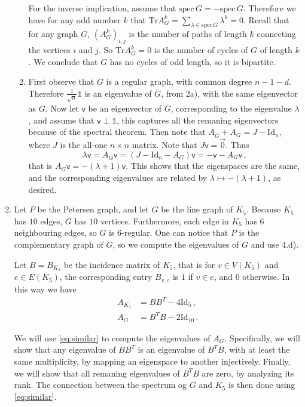 \documentclass[kulak]{tplt}
\theoremstyle{definition}
\newcommand{\vv}{\mathsf{v}}
\newcommand{\Tr}{\mathrm{Tr}}
\newcommand{\Id}{\mathrm{Id}}
\newcommand{\spec}{\mathrm{spec}}
\begin{document}
\begin{enumerate}
\begin{enumerate}
For the inverse implication, assume that $\spec \, G = - \spec \, G$.
Therefore we have for any odd number $k$ that $\Tr A_G^k = \sum_{\lambda \in \spec \, G } \lambda^k = 0$.
Recall that for any graph $G$, $(A_G^k)_{i, j}$ is the number of paths of length $k$ connecting the vertices $i$ and $j$.
So $\Tr A_G^k = 0$ is the number of cycles of $G$ of length $k$.
We conclude that $G$ has no cycles of odd length, so it is bipartite.


\item 
First observe that $\overline{G}$ is a regular graph, with common degree $n - 1 - d $.
Therefore $\frac{1}{\sqrt{n}} \mathbb{1}$ is an eigenvalue of $\overline{G}$, from 2a), with the same eigenvector as $G$.
Now let $\vv $ be an eigenvector of $\overline{G}$, corresponding to the eigenvalue $\lambda$, and assume that $\vv \perp \mathbb{1}$, this captures all the remaning eigenvectors because of the spectral theorem.
Then note that $A_{\overline{G}} + A_G = J - \Id_n$, where $J$ is the all-one $n\times n$ matrix.
Note that $J\vv = \vec{0}$.
Thus
$$\lambda \vv = A_{\overline{G}}\vv = (J - \Id_n - A_G)\vv = -\vv - A_G \vv\, ,$$
that is $A_G \vv = -(\lambda + 1)\vv$.
This shows that the eigenspaces are the same, and the corresponding eigenvalues are related by $\lambda \mapsto -(\lambda + 1)$, as desired.
\end{enumerate}


\item 
Let $P$ be the Petersen graph, and let $G$ be the line graph of $K_5$.
Because $K_5$ has $10$ edges, $G$ has $10$ vertices.
Furthermore, each edge in $K_5$ has $6$ neighbouring edges, so $G$ is $6$-regular.
One can notice that $P$ is the complementary graph of $G$, so we compute the eigenvalues of $G$ and use 4.d).

Let $B = B_{K_5}$ be the incidence matrix of $K_5$, that is for $v\in V(K_5)$ and $e\in E(K_5)$, the corresponding entry $B_{v, e}$ is $1$ if $v\in e$, and $0$ otherwise.
In this way we have 
\begin{equation}\label{eq:similar}
\begin{split}
A_{K_5} &= B B^T - 4 \Id_{5} \, , \\
A_G &= B^T B - 2 \Id_{10} \, .
\end{split}
\end{equation}

We will use \eqref{eq:similar} to compute the eigenvalues of $A_G$.
Specifically, we will show that any eigenvalue of $B B^T$ is an eigenvalue of $B^T B$, with at least the same multiplicity, by mapping an eigenspace to another injectively.
Finally, we will show that all remaning eigenvalues of $B^T B$ are zero, by analyzing its rank.
The connection between the spectrum og $G$ and $K_5$ is then done using \eqref{eq:similar}.


\end{enumerate}
\end{document}
